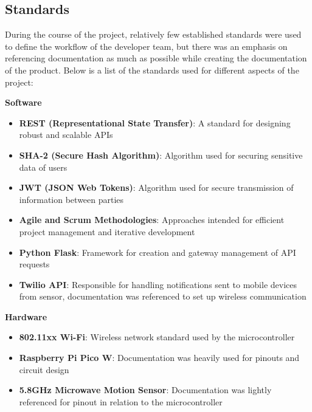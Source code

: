 \subsection{Standards}\label{subsec:standards}

During the course of the project, relatively few established standards were used to
define the workflow of the developer team, but there was an emphasis on referencing
documentation as much as possible while creating the documentation of the product. %
Below is a list of the standards used for different aspects of the project:

\textbf{Software}
\begin{itemize}
    \item \textbf{REST (Representational State Transfer)}: A standard for designing
    robust and scalable APIs
    \item \textbf{SHA-2 (Secure Hash Algorithm)}: Algorithm used for securing
    sensitive data of users
    \item \textbf{JWT (JSON Web Tokens)}: Algorithm used for secure transmission of
    information between parties
    \item \textbf{Agile and Scrum Methodologies}: Approaches intended for efficient
    project management and iterative development
    \item \textbf{Python Flask}: Framework for creation and gateway management of API
    requests
    \item \textbf{Twilio API}: Responsible for handling notifications sent to mobile
    devices from sensor, documentation was referenced to set up wireless communication
\end{itemize}

\textbf{Hardware}
\begin{itemize}
    \item \textbf{802.11xx Wi-Fi}: Wireless network standard used by the
    microcontroller
    \item \textbf{Raspberry Pi Pico W}: Documentation was heavily used for pinouts
    and circuit design~\cite{picoW_docs2016}
    \item \textbf{5.8GHz Microwave Motion Sensor}: Documentation was lightly
    referenced for pinout in relation to the microcontroller~\cite{CQRobot_specs2016}
\end{itemize}